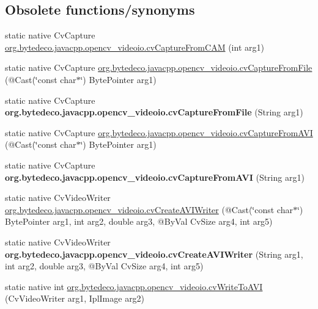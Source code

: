 \subsection*{Obsolete functions/synonyms}
\begin{DoxyCompactItemize}
\item 
static native Cv\+Capture \hyperlink{group__videoio__c_gafab92effdc81a1a2eb305dc69eb84bfd}{org.\+bytedeco.\+javacpp.\+opencv\+\_\+videoio.\+cv\+Capture\+From\+C\+AM} (int arg1)
\item 
static native Cv\+Capture \hyperlink{group__videoio__c_ga5fccc51ced33519e61c5687ca7b17fdb}{org.\+bytedeco.\+javacpp.\+opencv\+\_\+videoio.\+cv\+Capture\+From\+File} (@Cast(\char`\"{}const char$\ast$\char`\"{}) Byte\+Pointer arg1)
\item 
\mbox{\label{group__videoio__c_ga362ab0d5e5f178165435906f461d31d2}} 
static native Cv\+Capture {\bfseries org.\+bytedeco.\+javacpp.\+opencv\+\_\+videoio.\+cv\+Capture\+From\+File} (String arg1)
\item 
static native Cv\+Capture \hyperlink{group__videoio__c_ga153463bfe93115b2ff7783a8c504d2a7}{org.\+bytedeco.\+javacpp.\+opencv\+\_\+videoio.\+cv\+Capture\+From\+A\+VI} (@Cast(\char`\"{}const char$\ast$\char`\"{}) Byte\+Pointer arg1)
\item 
\mbox{\label{group__videoio__c_ga5d1f89d25b07da842237e8616fb24ddd}} 
static native Cv\+Capture {\bfseries org.\+bytedeco.\+javacpp.\+opencv\+\_\+videoio.\+cv\+Capture\+From\+A\+VI} (String arg1)
\item 
static native Cv\+Video\+Writer \hyperlink{group__videoio__c_ga7ac706f58e712a321ff4ed14d9c98dfc}{org.\+bytedeco.\+javacpp.\+opencv\+\_\+videoio.\+cv\+Create\+A\+V\+I\+Writer} (@Cast(\char`\"{}const char$\ast$\char`\"{}) Byte\+Pointer arg1, int arg2, double arg3, @By\+Val Cv\+Size arg4, int arg5)
\item 
\mbox{\label{group__videoio__c_gac9bbc9874bab2cd63a631a6a18cbbea9}} 
static native Cv\+Video\+Writer {\bfseries org.\+bytedeco.\+javacpp.\+opencv\+\_\+videoio.\+cv\+Create\+A\+V\+I\+Writer} (String arg1, int arg2, double arg3, @By\+Val Cv\+Size arg4, int arg5)
\item 
static native int \hyperlink{group__videoio__c_ga3f795024cbed8966f3b006b1ccd99acc}{org.\+bytedeco.\+javacpp.\+opencv\+\_\+videoio.\+cv\+Write\+To\+A\+VI} (Cv\+Video\+Writer arg1, Ipl\+Image arg2)
\end{DoxyCompactItemize}


